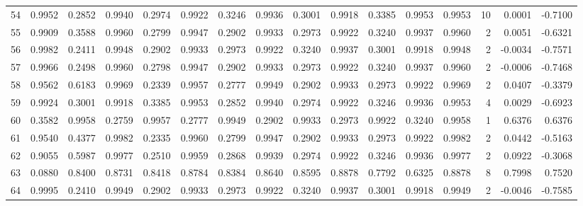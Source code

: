 \begin{tabular}{lrrrrrrrrrrrrrrr}
54  &      0.9952 &  0.2852 &  0.9940 &  0.2974 &  0.9922 &  0.3246 &  0.9936 &  0.3001 &  0.9918 &  0.3385 &   0.9953 &     0.9953 &     10 &                    0.0001 &                    -0.7100 \\
55  &      0.9909 &  0.3588 &  0.9960 &  0.2799 &  0.9947 &  0.2902 &  0.9933 &  0.2973 &  0.9922 &  0.3240 &   0.9937 &     0.9960 &      2 &                    0.0051 &                    -0.6321 \\
56  &      0.9982 &  0.2411 &  0.9948 &  0.2902 &  0.9933 &  0.2973 &  0.9922 &  0.3240 &  0.9937 &  0.3001 &   0.9918 &     0.9948 &      2 &                   -0.0034 &                    -0.7571 \\
57  &      0.9966 &  0.2498 &  0.9960 &  0.2798 &  0.9947 &  0.2902 &  0.9933 &  0.2973 &  0.9922 &  0.3240 &   0.9937 &     0.9960 &      2 &                   -0.0006 &                    -0.7468 \\
58  &      0.9562 &  0.6183 &  0.9969 &  0.2339 &  0.9957 &  0.2777 &  0.9949 &  0.2902 &  0.9933 &  0.2973 &   0.9922 &     0.9969 &      2 &                    0.0407 &                    -0.3379 \\
59  &      0.9924 &  0.3001 &  0.9918 &  0.3385 &  0.9953 &  0.2852 &  0.9940 &  0.2974 &  0.9922 &  0.3246 &   0.9936 &     0.9953 &      4 &                    0.0029 &                    -0.6923 \\
60  &      0.3582 &  0.9958 &  0.2759 &  0.9957 &  0.2777 &  0.9949 &  0.2902 &  0.9933 &  0.2973 &  0.9922 &   0.3240 &     0.9958 &      1 &                    0.6376 &                     0.6376 \\
61  &      0.9540 &  0.4377 &  0.9982 &  0.2335 &  0.9960 &  0.2799 &  0.9947 &  0.2902 &  0.9933 &  0.2973 &   0.9922 &     0.9982 &      2 &                    0.0442 &                    -0.5163 \\
62  &      0.9055 &  0.5987 &  0.9977 &  0.2510 &  0.9959 &  0.2868 &  0.9939 &  0.2974 &  0.9922 &  0.3246 &   0.9936 &     0.9977 &      2 &                    0.0922 &                    -0.3068 \\
63  &      0.0880 &  0.8400 &  0.8731 &  0.8418 &  0.8784 &  0.8384 &  0.8640 &  0.8595 &  0.8878 &  0.7792 &   0.6325 &     0.8878 &      8 &                    0.7998 &                     0.7520 \\
64  &      0.9995 &  0.2410 &  0.9949 &  0.2902 &  0.9933 &  0.2973 &  0.9922 &  0.3240 &  0.9937 &  0.3001 &   0.9918 &     0.9949 &      2 &                   -0.0046 &                    -0.7585 \\

\end{tabular}
